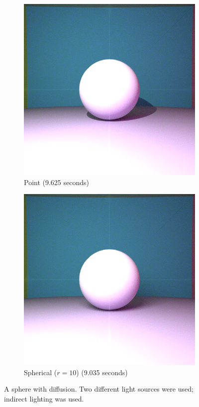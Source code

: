 \documentclass{amsart}
\begin{document}
\begin{figure}
     \centering
     \begin{subfigure}[b]{0.49\textwidth}
         \centering
         \includegraphics[width=\textwidth]{img/fig2_2.png}
         \caption{Point (9.625 seconds)}
     \end{subfigure}
     \hfill
     \begin{subfigure}[b]{0.49\textwidth}
         \centering
         \includegraphics[width=\textwidth]{img/fig3_2.png}
         \caption{Spherical ($r = 10$) (9.035 seconds)}
     \end{subfigure}
     \caption{A sphere with diffusion. Two different light sources were used; indirect lighting was used.}
\end{figure}
\end{document}
